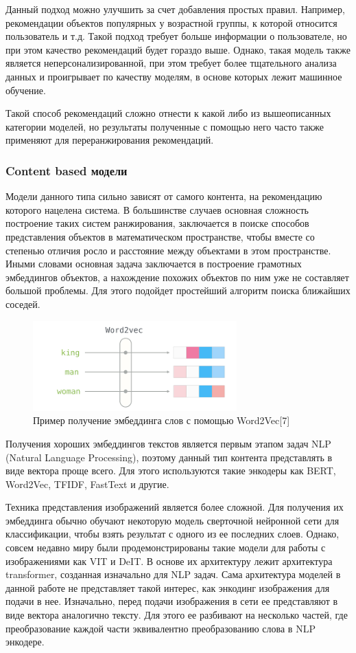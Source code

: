 \documentclass[bachelor, och, coursework]{SCWorks}
\begin{document}
Данный подход можно улучшить за счет добавления простых правил. Например, рекомендации объектов популярных у
возрастной группы, к которой относится пользователь и т.д. Такой подход требует больше информации о пользователе,
но при этом качество рекомендаций будет гораздо выше. Однако, такая модель также является неперсонализированной,
при этом требует более тщательного анализа данных и проигрывает по качеству моделям, в основе которых лежит машинное
обучение.

Такой способ рекомендаций сложно отнести к какой либо из вышеописанных категории моделей, но результаты полученные
с помощью него часто также применяют для переранжирования рекомендаций.
\subsubsection{Content based модели}
Модели данного типа сильно зависят от самого контента, на рекомендацию которого нацелена система. В большинстве случаев
основная сложность построение таких систем ранжирования, заключается в поиске способов представления объектов в математическом
пространстве, чтобы вместе со степенью отличия росло и расстояние между объектами в этом пространстве. Иными словами
основная задача заключается в построение грамотных эмбеддингов объектов, а нахождение похожих объектов по ним уже не
составляет большой проблемы. Для этого подойдет простейший алгоритм поиска ближайших соседей.

\begin{figure}[H]
    \centering
    \includegraphics[width=0.7\textwidth]{pic/5}
    \caption{Пример получение эмбеддинга слов с помощью Word2Vec[7]}
    \label{fig:img1}
\end{figure}

Получения хороших эмбеддингов текстов является первым этапом задач NLP (Natural Language Processing), поэтому данный тип
контента представлять в виде вектора проще всего. Для этого используются такие энкодеры как BERT, Word2Vec, TFIDF, FastText и другие.

Техника представления изображений является более сложной. Для получения их эмбеддинга обычно обучают некоторую модель сверточной нейронной сети для
классификации, чтобы взять результат с одного из ее последних слоев. Однако, совсем недавно миру были продемонстрированы такие модели
для работы с изображениями как VIT и DeIT. В основе их архитектуру лежит архитектура transformer, созданная изначально для NLP задач.
Сама архитектура моделей в данной работе не представляет такой интерес, как энкодинг изображения для подачи в нее. Изначально,
перед подачи изображения в сети ее представляют в виде вектора аналогично тексту. Для этого ее разбивают на несколько
частей, где преобразование каждой части эквивалентно преобразованию слова в NLP энкодере.
\end{document}
